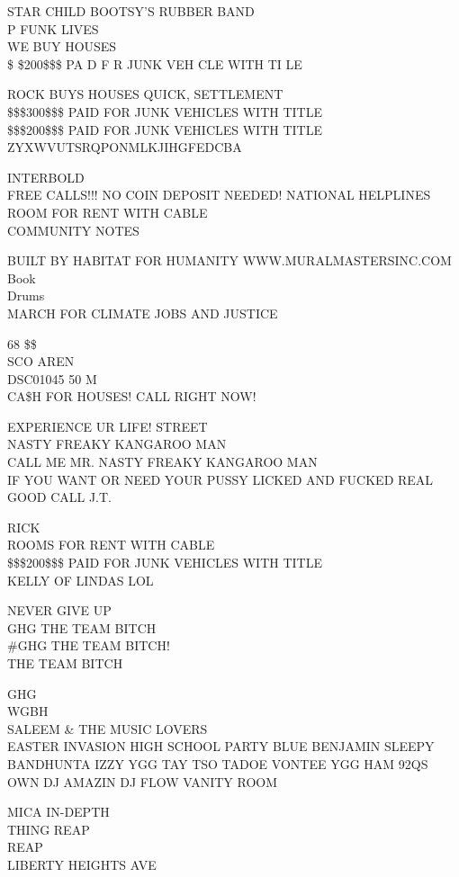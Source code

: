 \documentclass[10pt,letterpaper]{article}
\begin{document}
STAR CHILD BOOTSY'S RUBBER BAND\\
P FUNK LIVES\\
WE BUY HOUSES\\
\$ \$200\$\$\$ PA D F R JUNK VEH CLE WITH TI LE

ROCK BUYS HOUSES QUICK, SETTLEMENT\\
\$\$\$300\$\$\$ PAID FOR JUNK VEHICLES WITH TITLE\\
\$\$\$200\$\$\$ PAID FOR JUNK VEHICLES WITH TITLE\\
ZYXWVUTSRQPONMLKJIHGFEDCBA

INTERBOLD\\
FREE CALLS!!! NO COIN DEPOSIT NEEDED!  NATIONAL HELPLINES\\
ROOM FOR RENT WITH CABLE\\
COMMUNITY NOTES

BUILT BY HABITAT FOR HUMANITY WWW.MURALMASTERSINC.COM\\
Book\\
Drums\\
MARCH FOR CLIMATE JOBS AND JUSTICE

68 \$\$\\
SCO AREN\\
DSC01045 50 M\\
CA\$H FOR HOUSES!  CALL RIGHT NOW!

EXPERIENCE UR LIFE! STREET\\
NASTY FREAKY KANGAROO MAN\\
CALL ME MR. NASTY FREAKY KANGAROO MAN\\
IF YOU WANT OR NEED YOUR PUSSY LICKED AND FUCKED REAL GOOD CALL J.T.

RICK\\
ROOMS FOR RENT WITH CABLE\\
\$\$\$200\$\$\$ PAID FOR JUNK VEHICLES WITH TITLE\\
KELLY OF LINDAS LOL

NEVER GIVE UP\\
GHG THE TEAM BITCH\\
\#GHG THE TEAM BITCH!\\
THE TEAM BITCH

GHG\\
WGBH\\
SALEEM \& THE MUSIC LOVERS\\
EASTER INVASION HIGH SCHOOL PARTY BLUE BENJAMIN SLEEPY BANDHUNTA IZZY YGG TAY TSO TADOE VONTEE YGG HAM 92QS OWN DJ AMAZIN DJ FLOW VANITY ROOM

MICA IN{-}DEPTH\\
THING REAP\\
REAP\\
LIBERTY HEIGHTS AVE
\end{document}
